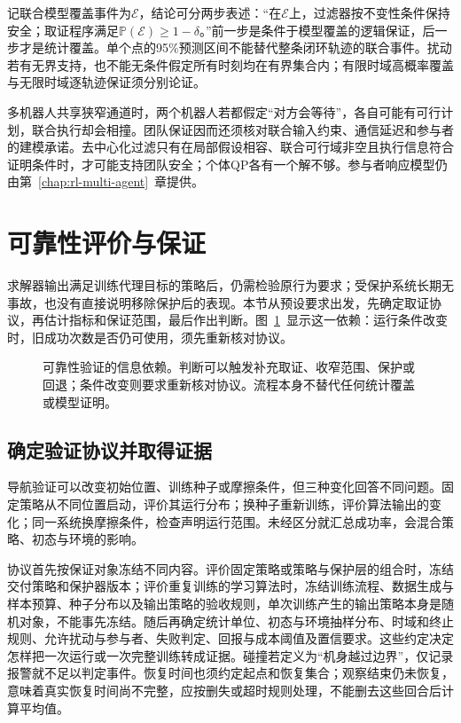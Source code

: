 记联合模型覆盖事件为$\mathcal E$，结论可分两步表述：“在$\mathcal E$上，过滤器按不变性条件保持安全；取证程序满足$\mathbb P(\mathcal E)\geq1-\delta$。”前一步是条件于模型覆盖的逻辑保证，后一步才是统计覆盖。单个点的95\%预测区间不能替代整条闭环轨迹的联合事件。扰动若有无界支持，也不能无条件假定所有时刻均在有界集合内；有限时域高概率覆盖与无限时域逐轨迹保证须分别论证。

多机器人共享狭窄通道时，两个机器人若都假定“对方会等待”，各自可能有可行计划，联合执行却会相撞。团队保证因而还须核对联合输入约束、通信延迟和参与者的建模承诺。去中心化过滤只有在局部假设相容、联合可行域非空且执行信息符合证明条件时，才可能支持团队安全；个体QP各有一个解不够。参与者响应模型仍由第~\ref{chap:rl-multi-agent}~章提供。

\section{可靠性评价与保证}
\label{sec:rl-trustworthy-evidence}

求解器输出满足训练代理目标的策略后，仍需检验原行为要求；受保护系统长期无事故，也没有直接说明移除保护后的表现。本节从预设要求出发，先确定取证协议，再估计指标和保证范围，最后作出判断。图~\ref{fig:rl-trustworthy-validation}~显示这一依赖：运行条件改变时，旧成功次数是否仍可使用，须先重新核对协议。

\begin{figure}[t]
  \centering
  
  \caption{可靠性验证的信息依赖。判断可以触发补充取证、收窄范围、保护或回退；条件改变则要求重新核对协议。流程本身不替代任何统计覆盖或模型证明。}
  \label{fig:rl-trustworthy-validation}
\end{figure}

\subsection{确定验证协议并取得证据}
\label{sec:rl-trustworthy-protocol}

导航验证可以改变初始位置、训练种子或摩擦条件，但三种变化回答不同问题。固定策略从不同位置启动，评价其运行分布；换种子重新训练，评价算法输出的变化；同一系统换摩擦条件，检查声明运行范围。未经区分就汇总成功率，会混合策略、初态与环境的影响。

协议首先按保证对象冻结不同内容。评价固定策略或策略与保护层的组合时，冻结交付策略和保护器版本；评价重复训练的学习算法时，冻结训练流程、数据生成与样本预算、种子分布以及输出策略的验收规则，单次训练产生的输出策略本身是随机对象，不能事先冻结。随后再确定统计单位、初态与环境抽样分布、时域和终止规则、允许扰动与参与者、失败判定、回报与成本阈值及置信要求。这些约定决定怎样把一次运行或一次完整训练转成证据。碰撞若定义为“机身越过边界”，仅记录报警就不足以判定事件。恢复时间也须约定起点和恢复集合；观察结束仍未恢复，意味着真实恢复时间尚不完整，应按删失或超时规则处理，不能删去这些回合后计算平均值。

